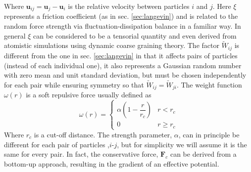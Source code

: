 \documentclass[ twoside,openright,titlepage,numbers=noenddot,%
headinclude,footinclude,cleardoublepage=empty,abstract=on,
BCOR=5mm,paper=b5,fontsize=11pt, dvipsnames
]{scrreprt}
\renewcommand{\vec}[1]{\bm{#1}}
\newcommand{\pvel}{u}
\begin{document}
Where $\vec{\pvel}_{ij} = \vec{\pvel}_j - \vec{\pvel}_i$ is the relative velocity between particles $i$ and $j$. Here $\xi$ represents a friction coefficient (as in sec. \ref{sec:langevin}) and is related to the random force strength via fluctuation-dissipation balance in a familiar way\cite{Espanol1995}. In general $\xi$ can be considered to be a tensorial quantity and even derived from atomistic simulations using dynamic coarse graining theory\cite{Hijon2010}. The factor $\widetilde{W}_{ij}$ is different from the one in sec. \ref{sec:langevin} in that it affects pairs of particles (instead of each individual one), it also represents a Gaussian random number with zero mean and unit standard deviation, but must be chosen independently for each pair while ensuring symmetry so that $\widetilde{W}_{ij} = \widetilde{W}_{ji}$.
The weight function $\omega(r)$ is a soft repulsive force usually defined as
\begin{equation}
  \label{eq:dpdw}
  \omega(r) =
  \begin{cases}
    \alpha\left(1-\dfrac{r}{r_{c}}\right) & r<r_{c}\\
    0 & r\ge r_{c}
  \end{cases}
\end{equation}
Where $r_{c}$ is a cut-off distance. The strength parameter, $\alpha$, can in principle be different for each pair of particles ,$i$-$j$, but for simplicity we will assume it is the same for every pair. In fact, the conservative force, $\vec{F}_c$ can be derived from a bottom-up approach, resulting in the gradient of an effective potential\cite{Hijon2010}.
\end{document}

